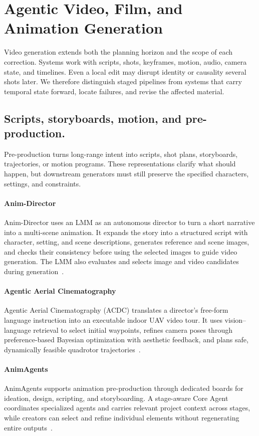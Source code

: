 \section{Agentic Video, Film, and Animation Generation}
\label{sec:video-animation}

Video generation extends both the planning horizon and the scope of each correction. Systems work with scripts, shots, keyframes, motion, audio, camera state, and timelines. Even a local edit may disrupt identity or causality several shots later. We therefore distinguish staged pipelines from systems that carry temporal state forward, locate failures, and revise the affected material.

\subsection{Scripts, storyboards, motion, and pre-production.}
Pre-production turns long-range intent into scripts, shot plans, storyboards, trajectories, or motion programs. These representations clarify what should happen, but downstream generators must still preserve the specified characters, settings, and constraints.

\paragraph{Anim-Director}
Anim-Director uses an LMM as an autonomous director to turn a short narrative into a multi-scene animation. It expands the story into a structured script with character, setting, and scene descriptions, generates reference and scene images, and checks their consistency before using the selected images to guide video generation. The LMM also evaluates and selects image and video candidates during generation~\cite{avg240809787}.

\paragraph{Agentic Aerial Cinematography}
Agentic Aerial Cinematography (ACDC) translates a director's free-form language instruction into an executable indoor UAV video tour. It uses vision--language retrieval to select initial waypoints, refines camera poses through preference-based Bayesian optimization with aesthetic feedback, and plans safe, dynamically feasible quadrotor trajectories~\cite{avg250916176}.

\paragraph{AnimAgents}
AnimAgents supports animation pre-production through dedicated boards for ideation, design, scripting, and storyboarding. A stage-aware Core Agent coordinates specialized agents and carries relevant project context across stages, while creators can select and refine individual elements without regenerating entire outputs~\cite{avg251117906}.


